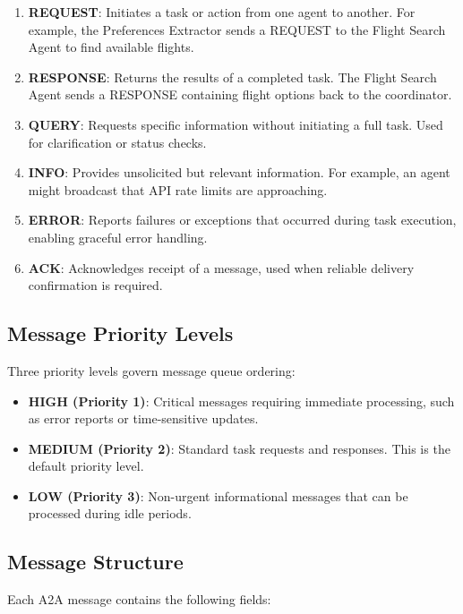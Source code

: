 \documentclass[preprint,review,12pt]{elsarticle}
\begin{document}
\begin{enumerate}
    \item \textbf{REQUEST}: Initiates a task or action from one agent to another. For example, the Preferences Extractor sends a REQUEST to the Flight Search Agent to find available flights.
    \item \textbf{RESPONSE}: Returns the results of a completed task. The Flight Search Agent sends a RESPONSE containing flight options back to the coordinator.
    \item \textbf{QUERY}: Requests specific information without initiating a full task. Used for clarification or status checks.
    \item \textbf{INFO}: Provides unsolicited but relevant information. For example, an agent might broadcast that API rate limits are approaching.
    \item \textbf{ERROR}: Reports failures or exceptions that occurred during task execution, enabling graceful error handling.
    \item \textbf{ACK}: Acknowledges receipt of a message, used when reliable delivery confirmation is required.
\end{enumerate}

\subsection*{Message Priority Levels}

Three priority levels govern message queue ordering:

\begin{itemize}
    \item \textbf{HIGH (Priority 1)}: Critical messages requiring immediate processing, such as error reports or time-sensitive updates.
    \item \textbf{MEDIUM (Priority 2)}: Standard task requests and responses. This is the default priority level.
    \item \textbf{LOW (Priority 3)}: Non-urgent informational messages that can be processed during idle periods.
\end{itemize}

\subsection*{Message Structure}

Each A2A message contains the following fields:
\end{document}

